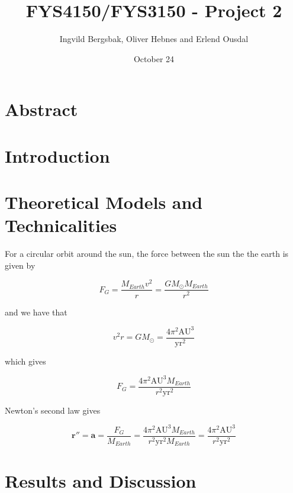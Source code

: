 \documentclass{article}
\begin{document}
\title{\textbf{FYS4150/FYS3150 - Project 2}}
\author{Ingvild Bergsbak, Oliver Hebnes and Erlend Ousdal}
\date{October 24}




\maketitle

\section{Abstract}

\section{Introduction}

\section{Theoretical Models and Technicalities}

For a circular orbit around the sun, the force between the sun the the earth is given by

$$F_G=\frac{M_{Earth}v^2}{r}=\frac{GM_{\odot}M_{Earth}}{r^2}$$

and we have that

$$v^2r=GM_{\odot}=\frac{4\pi^2\mathrm{AU}^3}{\mathrm{yr}^2}$$

which gives

$$F_G=\frac{4\pi^2\mathrm{AU}^3M_{Earth}}{r^2\mathrm{yr}^2}$$

Newton's second law gives

$$\mathbf{r}''=\mathbf{a}=\frac{F_G}{M_{Earth}}=\frac{4\pi^2\mathrm{AU}^3M_{Earth}}{r^2\mathrm{yr}^2M_{Earth}}=\frac{4\pi^2\mathrm{AU}^3}{r^2\mathrm{yr}^2}$$


\section{Results and Discussion}
\end{document}
